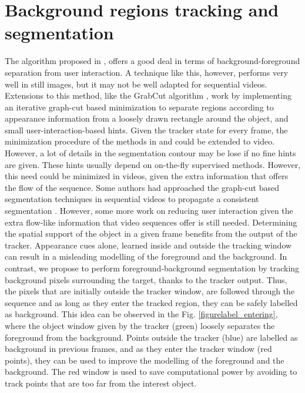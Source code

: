 
\section{Background regions tracking and segmentation}
\label{sec:segm}
The algorithm proposed in \cite{c18}, offers a good deal in terms of
background-foreground separation from user interaction. A technique like this, however,
performs very well in still images, but it may not be well adapted for sequential videos. 
Extensions to this method, like the GrabCut algorithm \cite{c14}, work by implementing an iterative graph-cut based 
minimization to separate regions according to appearance information from a loosely drawn rectangle around the object, and small user-interaction-based hints. 
Given the tracker state for every frame, the minimization procedure of the methods in \cite{c18} and \cite{c14} could be extended to video. However, 
a lot of details in the segmentation contour may be lose if no fine hints are given.
These hints usually depend on on-the-fly supervised methods. However, this need could be minimized in videos, given the extra information that offers the flow of the sequence.
Some authors had approached the graph-cut based segmentation techniques in sequential
videos to propagate a consistent segmentation \cite{c15}. However, some more work on reducing user interaction given the extra flow-like information
that video sequences offer is still needed.
Determining the spatial support of the object in a given frame benefits from the output of the tracker. Appearance cues alone, learned inside and outside the tracking window 
can result in a misleading modelling of the foreground and the background. In contrast, we propose to perform foreground-background segmentation by tracking 
background pixels surrounding the target, thanks to the tracker output. Thus, the pixels that are initially outside the tracker window, 
are followed through the sequence and as long as they enter the tracked region, they can be safely labelled as background. 
This idea can be observed in the Fig.  \ref{figurelabel_entering}, 
where the object window given by the tracker (green) loosely separates the foreground from the background. Points outside the tracker (blue) are labelled as background in previous frames, and as they enter the tracker window (red points), they can be used to improve the modelling  of the foreground and the background. 
The red window is used to save computational power by avoiding to track points that are too far from the interest object.

